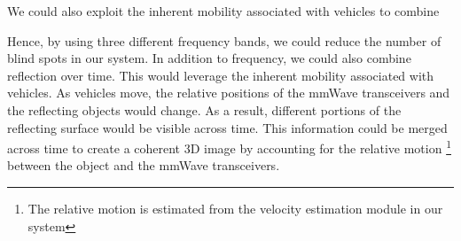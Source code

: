  We could also exploit the inherent mobility associated with vehicles to combine 

 Hence, by using three different frequency bands, we could reduce the number of blind spots in our system. In addition to frequency, we could also combine reflection over time. This would leverage the inherent mobility associated with vehicles. As vehicles move, the relative positions of the mmWave
transceivers and the reflecting objects would change. As a 
result, different portions of the reflecting surface would be visible across time. This information could be merged across time to create a coherent 3D image by accounting for the relative motion \footnote{The relative motion is estimated from the velocity estimation module in our system} between the object and the mmWave transceivers. 
\fi


\iffalse
In order to generate high resolution images using mmWave, we combine the received FMCW signals at the three different frequency bands, i.e. 24 Ghz, 60 Ghz and 77 Ghz.  Instead, we combine the received FMCW ramps from the three frequency bands to generate a "virtual" FMCW sweep that spans a much higher bandwidth. This technique has the potential to provide three-fold improvement in resolution over using FMCW at a single frequency band.


In addition to latency


In order to obtain and complete and a high resolution image, we need to address tha challenge of specularity.


\fi
